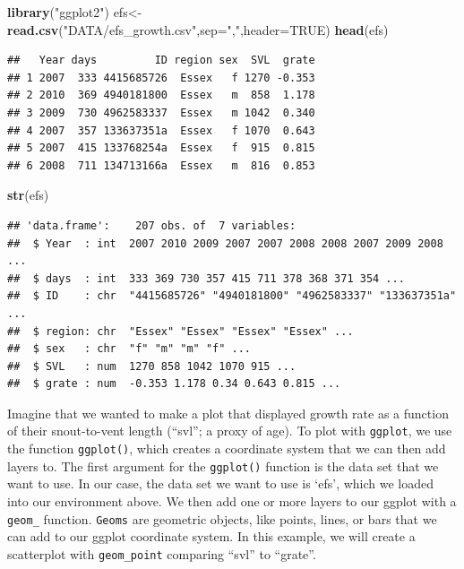 \documentclass[
]{book}
\newenvironment{Shaded}{\begin{snugshade}}{\end{snugshade}}
\newcommand{\AttributeTok}[1]{\textcolor[rgb]{0.13,0.29,0.53}{#1}}
\newcommand{\ConstantTok}[1]{\textcolor[rgb]{0.56,0.35,0.01}{#1}}
\newcommand{\FunctionTok}[1]{\textcolor[rgb]{0.13,0.29,0.53}{\textbf{#1}}}
\newcommand{\NormalTok}[1]{#1}
\newcommand{\OtherTok}[1]{\textcolor[rgb]{0.56,0.35,0.01}{#1}}
\newcommand{\StringTok}[1]{\textcolor[rgb]{0.31,0.60,0.02}{#1}}
\begin{document}
\begin{Shaded}
\begin{Highlighting}[]
\FunctionTok{library}\NormalTok{(}\StringTok{"ggplot2"}\NormalTok{)}
\NormalTok{efs}\OtherTok{\textless{}{-}}\FunctionTok{read.csv}\NormalTok{(}\StringTok{"DATA/efs\_growth.csv"}\NormalTok{,}\AttributeTok{sep=}\StringTok{","}\NormalTok{,}\AttributeTok{header=}\ConstantTok{TRUE}\NormalTok{)}
\FunctionTok{head}\NormalTok{(efs)}
\end{Highlighting}
\end{Shaded}

\begin{verbatim}
##   Year days         ID region sex  SVL  grate
## 1 2007  333 4415685726  Essex   f 1270 -0.353
## 2 2010  369 4940181800  Essex   m  858  1.178
## 3 2009  730 4962583337  Essex   m 1042  0.340
## 4 2007  357 133637351a  Essex   f 1070  0.643
## 5 2007  415 133768254a  Essex   f  915  0.815
## 6 2008  711 134713166a  Essex   m  816  0.853
\end{verbatim}

\begin{Shaded}
\begin{Highlighting}[]
\FunctionTok{str}\NormalTok{(efs)}
\end{Highlighting}
\end{Shaded}

\begin{verbatim}
## 'data.frame':    207 obs. of  7 variables:
##  $ Year  : int  2007 2010 2009 2007 2007 2008 2008 2007 2009 2008 ...
##  $ days  : int  333 369 730 357 415 711 378 368 371 354 ...
##  $ ID    : chr  "4415685726" "4940181800" "4962583337" "133637351a" ...
##  $ region: chr  "Essex" "Essex" "Essex" "Essex" ...
##  $ sex   : chr  "f" "m" "m" "f" ...
##  $ SVL   : num  1270 858 1042 1070 915 ...
##  $ grate : num  -0.353 1.178 0.34 0.643 0.815 ...
\end{verbatim}

Imagine that we wanted to make a plot that displayed growth rate as a function of their snout-to-vent length (``svl''; a proxy of age). To plot with \texttt{ggplot}, we use the function \texttt{ggplot()}, which creates a coordinate system that we can then add layers to. The first argument for the \texttt{ggplot()} function is the data set that we want to use. In our case, the data set we want to use is `efs', which we loaded into our environment above. We then add one or more layers to our ggplot with a \texttt{geom\_} function. \texttt{Geoms} are geometric objects, like points, lines, or bars that we can add to our ggplot coordinate system. In this example, we will create a scatterplot with \texttt{geom\_point} comparing ``svl'' to ``grate''.
\end{document}
